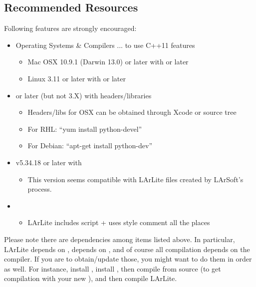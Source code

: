 \subsection{Recommended Resources}
Following features are strongly encouraged:
\begin{itemize}
    \item Operating Systems \& Compilers ... to use {\ttfamily C++11} features
      \begin{itemize}
          \item Mac OSX 10.9.1 (Darwin 13.0) or later with  or later
          \item Linux 3.11 or later with  or later
      \end{itemize}

    \item {} or later (but not 3.X) with headers/libraries
      \begin{itemize}
          \item Headers/libs for OSX can be obtained through Xcode or source tree
          \item For RHL: ``{\ttfamily yum install python-devel}'' 
          \item For Debian: ``{\ttfamily apt-get install python-dev}''
      \end{itemize}

    \item \ROOT v5.34.18 or later with \PyROOT
      \begin{itemize}
          \item This version seems compatible with LArLite files created by LArSoft's \ROOT process.
      \end{itemize}

    \item \doxygen
      \begin{itemize}
          \item LArLite includes \doxygen script + uses \doxygen style comment all the places
      \end{itemize}

\end{itemize}

Please note there are dependencies among items listed above.
In particular, LArLite depends on \ROOT, \PyROOT depends on \python, and of course all compilation depends on the compiler.
If you are to obtain/update those, you might want to do them in order as well. 
For instance, install \clang, install , then compile \ROOT from source (to get \PyROOT compilation with your new \python), 
and then compile LArLite.

